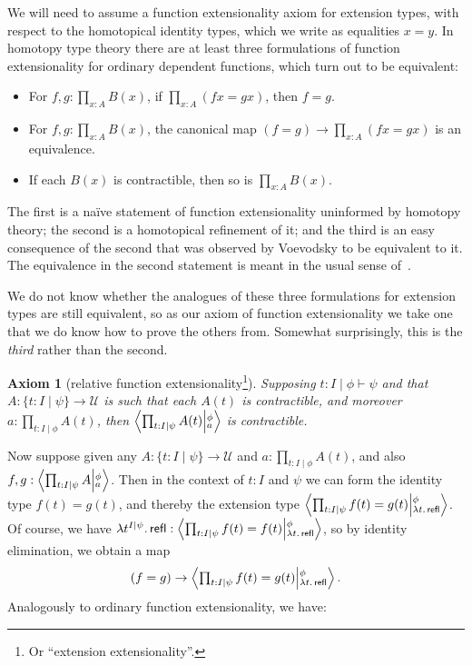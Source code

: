 \documentclass[12pt]{amsart}
\theoremstyle{plain}
\newtheorem{ax}[thm]{Axiom}
\theoremstyle{definition}
\theoremstyle{remark}
\numberwithin{equation}{section}
\newcommand{\tprod}{\textstyle\prod}
\newcommand{\exten}[4]{\left\langle\mathchoice{\textstyle\prod_{#1}}{\textstyle\prod_{#1}}{\scriptstyle\prod_{#1}}{\scriptscriptstyle\prod_{#1}} #2 \middle|^{#3}_{#4}\right\rangle}
\newcommand{\types}{\vdash}
\newcommand{\univtype}{\mathcal{U}}
\newcommand{\sh}[2]{\{#1\mid #2\}}
\newcommand{\refl}{\mathsf{refl}}
\newcommand{\lam}[1]{\lambda #1.\,}
\begin{document}
We will need to assume a function extensionality axiom for extension types, with respect to the homotopical identity types, which we write as equalities $x=y$.
In homotopy type theory there are at least three formulations of function extensionality for ordinary dependent functions, which turn out to be equivalent:
\begin{itemize}
\item For $f,g:\tprod_{x:A}B(x)$, if $\tprod_{x:A} (fx=gx)$, then $f=g$.
\item For $f,g:\tprod_{x:A}B(x)$, the canonical map $(f=g) \to \tprod_{x:A} (fx=gx)$ is an equivalence.
\item If each $B(x)$ is contractible, then so is $\tprod_{x:A} B(x)$.
\end{itemize}
The first is a na\"{i}ve statement of function extensionality uninformed by homotopy theory; the second is a homotopical refinement of it; and the third is an easy consequence of the second that was observed by Voevodsky to be equivalent to it. The equivalence in the second statement is meant  in the usual sense of~\cite[\S4.5]{hottbook}.


We do not know whether the analogues of these three formulations for extension types are still equivalent, so as our axiom of function extensionality we take one that we do know how to prove the others from.
Somewhat surprisingly, this is the \emph{third} rather than the second.

\begin{ax}[relative function extensionality\footnote{Or ``extension extensionality''.}]\label{ax:extfunext}
{ Supposing $t:I \mid \phi\types\psi$ and that $A:\sh{t:I}{\psi}\to\univtype$ is such that each $A(t)$ is contractible, and moreover $a:\tprod_{t:I\mid\phi} A(t)$, then $\exten{t:I\mid\psi}{A(t)}{\phi}{a}$ is contractible.}
\end{ax}

Now suppose given any $A:\sh{t:I}{\psi}\to\univtype$ and $a:\tprod_{t:I\mid\phi} A(t)$, and also $f,g:\exten{t:I \mid \psi}{A}{\phi}{a}$.
Then in the context of $t:I$ and $\psi$ we can form the identity type $f(t)=g(t)$, and thereby the extension type $\exten{t:I \mid \psi}{f(t)=g(t)}{\phi}{\lam{t}\refl}$.
Of course, we have $\lam{t^{I\mid\psi}} \refl : \exten{t:I \mid \psi}{f(t)=f(t)}{\phi}{\lam{t}\refl}$, so by identity elimination, we obtain a map
\begin{equation} (f=g) \to \exten{t:I \mid \psi}{f(t)=g(t)}{\phi}{\lam{t}\refl}.\label{eq:extension-extensionality}
\end{equation}
Analogously to ordinary function extensionality, we have:
\end{document}

